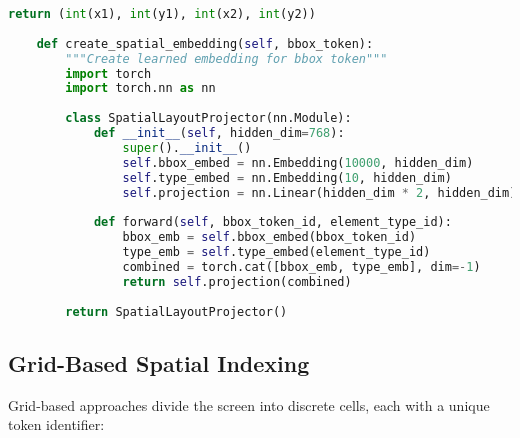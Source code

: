 \begin{lstlisting}[language=Python, caption=Single token bounding box encoding]
        return (int(x1), int(y1), int(x2), int(y2))
    
    def create_spatial_embedding(self, bbox_token):
        """Create learned embedding for bbox token"""
        import torch
        import torch.nn as nn
        
        class SpatialLayoutProjector(nn.Module):
            def __init__(self, hidden_dim=768):
                super().__init__()
                self.bbox_embed = nn.Embedding(10000, hidden_dim)
                self.type_embed = nn.Embedding(10, hidden_dim)
                self.projection = nn.Linear(hidden_dim * 2, hidden_dim)
                
            def forward(self, bbox_token_id, element_type_id):
                bbox_emb = self.bbox_embed(bbox_token_id)
                type_emb = self.type_embed(element_type_id)
                combined = torch.cat([bbox_emb, type_emb], dim=-1)
                return self.projection(combined)
        
        return SpatialLayoutProjector()
\end{lstlisting}

\subsection{Grid-Based Spatial Indexing}

Grid-based approaches divide the screen into discrete cells, each with a unique token identifier:

